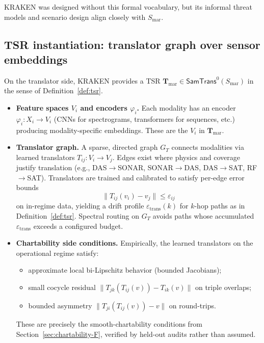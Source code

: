 \documentclass[11pt]{article}
\newcommand{\SamTrans}{\mathsf{SamTrans}}
\begin{document}
KRAKEN was designed without this formal vocabulary, but its informal threat
models and scenario design align closely with $S_{\mathrm{mar}}$.

\subsection{TSR instantiation: translator graph over sensor embeddings}

On the translator side, KRAKEN provides a TSR
$\mathbf{T}_{\mathrm{mar}} \in \SamTrans^0(S_{\mathrm{mar}})$ in the sense of
Definition~\ref{def:tsr}.

\begin{itemize}
  \item \textbf{Feature spaces $V_i$ and encoders $\varphi_i$.} Each modality
  has an encoder $\varphi_i : X_i \to V_i$ (CNNs for spectrograms, transformers
  for sequences, etc.) producing modality-specific embeddings. These are the
  $V_i$ in $\mathbf{T}_{\mathrm{mar}}$.

  \item \textbf{Translator graph.} A sparse, directed graph $G_T$ connects
  modalities via learned translators $T_{ij} : V_i \to V_j$.
  Edges exist where physics and coverage justify translation (e.g., DAS$\to$SONAR,
  SONAR$\to$DAS, DAS$\to$SAT, RF$\to$SAT). Translators are trained and calibrated
  to satisfy per-edge error bounds
  \[
    \bigl\| T_{ij}(v_i) - v_j \bigr\| \le \varepsilon_{ij}
  \]
  on in-regime data, yielding a drift profile $\varepsilon_{\mathrm{trans}}(k)$
  for $k$-hop paths as in Definition~\ref{def:tsr}. Spectral routing on $G_T$
  avoids paths whose accumulated $\varepsilon_{\mathrm{trans}}$ exceeds a
  configured budget.

  \item \textbf{Chartability side conditions.} Empirically, the learned
  translators on the operational regime satisfy:
  \begin{itemize}
    \item approximate local bi-Lipschitz behavior (bounded Jacobians);
    \item small cocycle residual
      $\|T_{jk}(T_{ij}(v)) - T_{ik}(v)\|$ on triple overlaps;
    \item bounded asymmetry $\|T_{ji}(T_{ij}(v)) - v\|$ on round-trips.
  \end{itemize}
  These are precisely the smooth-chartability conditions from
  Section~\ref{sec:chartability-F}, verified by held-out audits rather than
  assumed.
\end{itemize}
\end{document}
